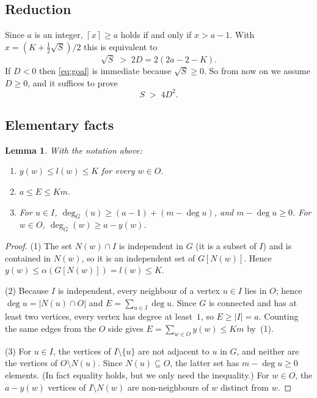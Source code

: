 \documentclass[11pt]{article}
\newtheorem{lemma}[theorem]{Lemma}
\theoremstyle{definition}
\theoremstyle{remark}
\newcommand{\Gbar}{\overline{G}}
\newcommand{\ceil}[1]{\left\lceil #1 \right\rceil}
\begin{document}
\subsection{Reduction}

Since $a$ is an integer, $\ceil{x} \ge a$ holds if and only if $x > a-1$.
With $x = (K + \tfrac12\sqrt S)/2$ this is equivalent to
\begin{equation}\label{eq:goal}
  \sqrt{S} \;>\; 2D = 2(2a-2-K).
\end{equation}
If $D < 0$ then \eqref{eq:goal} is immediate because $\sqrt S \ge 0$. So
from now on we assume $D \ge 0$, and it suffices to prove
\begin{equation}\label{eq:goal2}
  S \;>\; 4D^2.
\end{equation}

\subsection{Elementary facts}

\begin{lemma}\label{lem:facts}
With the notation above:
\begin{enumerate}
\item[(1)] $y(w) \le l(w) \le K$ for every $w \in O$.
\item[(2)] $a \le E \le K m$.
\item[(3)] For $u \in I$, $\deg_{\Gbar}(u) \ge (a-1) + (m - \deg u)$, and
  $m - \deg u \ge 0$. For $w \in O$, $\deg_{\Gbar}(w) \ge a - y(w)$.
\end{enumerate}
\end{lemma}

\begin{proof}
(1) The set $N(w) \cap I$ is independent in $G$ (it is a subset of $I$) and is
contained in $N(w)$, so it is an independent set of $G[N(w)]$. Hence
$y(w) \le \alpha(G[N(w)]) = l(w) \le K$.

(2) Because $I$ is independent, every neighbour of a vertex $u \in I$ lies in
$O$; hence $\deg u = |N(u) \cap O|$ and $E = \sum_{u \in I} \deg u$. Since $G$ is
connected and has at least two vertices, every vertex has degree at least~$1$,
so $E \ge |I| = a$. Counting the same edges from the $O$ side gives
$E = \sum_{w \in O} y(w) \le K m$ by~(1).

(3) For $u \in I$, the vertices of $I \setminus \{u\}$ are not adjacent to $u$
in $G$, and neither are the vertices of $O \setminus N(u)$. Since
$N(u) \subseteq O$, the latter set has $m - \deg u \ge 0$ elements. (In fact
equality holds, but we only need the inequality.) For $w \in O$, the
$a - y(w)$ vertices of $I \setminus N(w)$ are non-neighbours of $w$ distinct
from $w$.
\end{proof}
\end{document}
